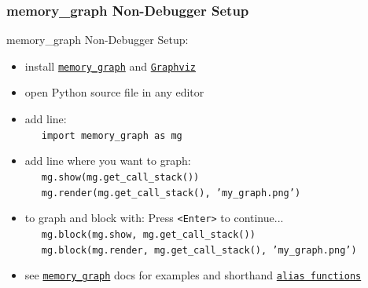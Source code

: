 \documentclass[10pt, colorlinks=true, urlcolor=blue]{beamer}
\begin{document}
\begin{frame}[fragile]\frametitle{memory\_graph Non-Debugger Setup}
  memory\_graph Non-Debugger Setup:
  \begin{itemize}
  \item install \href{https://pypi.org/project/memory-graph/}{\texttt{memory\_graph}} and \href{https://graphviz.org/download/}{\texttt{Graphviz}}
  \item open Python source file in any editor
  \item add line: \\ \ \ \ {\footnotesize \texttt{import memory_graph as mg}}
  \item add line where you want to graph: \\
    \ \ \ {\footnotesize \texttt{mg.show(mg.get_call_stack())}}\\
    \ \ \ {\footnotesize \texttt{mg.render(mg.get_call_stack(), 'my_graph.png')}}\\
  \item to graph and block with: Press \texttt{<Enter>} to continue...\\
    \ \ \ {\footnotesize \texttt{mg.block(mg.show, mg.get_call_stack())}}\\
    \ \ \ {\footnotesize \texttt{mg.block(mg.render, mg.get_call_stack(), 'my_graph.png')}}\\
  \item see \href{https://pypi.org/project/memory-graph/}{\texttt{memory\_graph}} docs for examples and shorthand \href{https://github.com/bterwijn/memory_graph?tab=readme-ov-file#debugging-without-debugger-tool}{\texttt{alias functions}}
  \end{itemize}
\end{frame}
\end{document}
